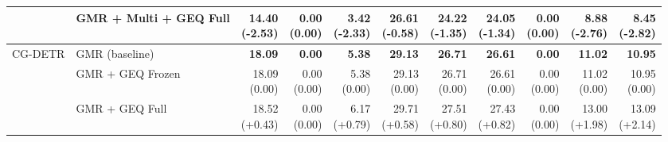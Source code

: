 \documentclass{article}
\begin{document}
{\begin{tabular}{llrrrrrrrrr}
 & GMR + Multi + GEQ Full & \shortstack{14.40 \\ {\scriptsize\textcolor{Loss}{(-2.53)}}} & \shortstack{0.00 \\ {\scriptsize\textcolor{Zero}{(0.00)}}} & \shortstack{3.42 \\ {\scriptsize\textcolor{Loss}{(-2.33)}}} & \shortstack{26.61 \\ {\scriptsize\textcolor{Loss}{(-0.58)}}} & \shortstack{24.22 \\ {\scriptsize\textcolor{Loss}{(-1.35)}}} & \shortstack{24.05 \\ {\scriptsize\textcolor{Loss}{(-1.34)}}} & \shortstack{0.00 \\ {\scriptsize\textcolor{Zero}{(0.00)}}} & \shortstack{8.88 \\ {\scriptsize\textcolor{Loss}{(-2.76)}}} & \shortstack{8.45 \\ {\scriptsize\textcolor{Loss}{(-2.82)}}} \\
\midrule
CG-DETR & GMR (baseline) & \textbf{18.09} & \textbf{0.00} & \textbf{5.38} & \textbf{29.13} & \textbf{26.71} & \textbf{26.61} & \textbf{0.00} & \textbf{11.02} & \textbf{10.95} \\
 & GMR + GEQ Frozen & \shortstack{18.09 \\ {\scriptsize\textcolor{Zero}{(0.00)}}} & \shortstack{0.00 \\ {\scriptsize\textcolor{Zero}{(0.00)}}} & \shortstack{5.38 \\ {\scriptsize\textcolor{Zero}{(0.00)}}} & \shortstack{29.13 \\ {\scriptsize\textcolor{Zero}{(0.00)}}} & \shortstack{26.71 \\ {\scriptsize\textcolor{Zero}{(0.00)}}} & \shortstack{26.61 \\ {\scriptsize\textcolor{Zero}{(0.00)}}} & \shortstack{0.00 \\ {\scriptsize\textcolor{Zero}{(0.00)}}} & \shortstack{11.02 \\ {\scriptsize\textcolor{Zero}{(0.00)}}} & \shortstack{10.95 \\ {\scriptsize\textcolor{Zero}{(0.00)}}} \\
 & GMR + GEQ Full & \shortstack{18.52 \\ {\scriptsize\textcolor{Gain}{(+0.43)}}} & \shortstack{0.00 \\ {\scriptsize\textcolor{Zero}{(0.00)}}} & \shortstack{6.17 \\ {\scriptsize\textcolor{Gain}{(+0.79)}}} & \shortstack{29.71 \\ {\scriptsize\textcolor{Gain}{(+0.58)}}} & \shortstack{27.51 \\ {\scriptsize\textcolor{Gain}{(+0.80)}}} & \shortstack{27.43 \\ {\scriptsize\textcolor{Gain}{(+0.82)}}} & \shortstack{0.00 \\ {\scriptsize\textcolor{Zero}{(0.00)}}} & \shortstack{13.00 \\ {\scriptsize\textcolor{Gain}{(+1.98)}}} & \shortstack{13.09 \\ {\scriptsize\textcolor{Gain}{(+2.14)}}} \\

\end{tabular}}
\end{document}

